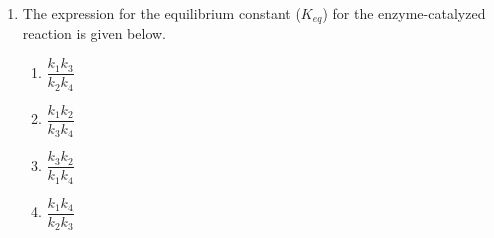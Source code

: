 \documentclass[journal,12pt,onecolumn]{exam}
\theoremstyle{remark}
\begin{document}
\begin{enumerate}
(A) (i) and (iv) \quad (B) (i) and (ii) \quad (C) (i) and (iii) \quad (D) (iii) and (iv)

\hfill{}

 

\begin{multicols}{2}
\begin{enumerate}
    \item \textcolor{red}{} A
    \item \textcolor{green}{\checkmark} B
    \item \textcolor{red}{} C
    \item \textcolor{red}{} D
\end{enumerate}
\end{multicols}

 

\item 
The expression for the equilibrium constant ($K_{eq}$) for the enzyme-catalyzed reaction is given below.

\begin{center}
\end{center}

\hfill{}

 

\begin{multicols}{2}
\begin{enumerate}
    \item \textcolor{green}{\checkmark} $\dfrac{k_1 k_3}{k_2 k_4}$
    \item \textcolor{red}{} $\dfrac{k_1 k_2}{k_3 k_4}$
    \item \textcolor{red}{} $\dfrac{k_3 k_2}{k_1 k_4}$
    \item \textcolor{red}{} $\dfrac{k_1 k_4}{k_2 k_3}$
\end{enumerate}
\end{multicols}

 


\end{enumerate}
\end{document}
